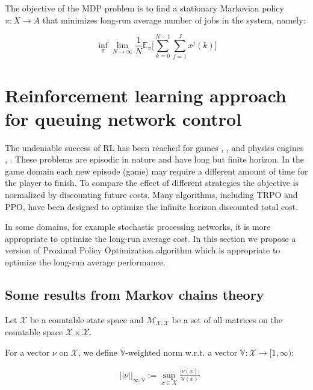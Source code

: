 \documentclass[11pt]{article}
\newcommand{\E}{\mathbb{E}}
\newcommand{\X}{\mathcal{X}}
\newcommand{\M}{\mathcal{M}}
\newcommand{\V}{\mathbb{V}}
\theoremstyle{definition}
\numberwithin{equation}{section}
\begin{document}
The objective of the MDP problem  is to find a stationary Markovian policy $\pi:X\rightarrow A$ that minimizes long-run average number of jobs in the system, namely:

\begin{equation}
 \inf\limits_\pi \lim\limits_{N\rightarrow \infty} \frac{1}{N} \E_{\pi}\Big[\sum\limits_{k=0}^{N-1}\sum\limits_{j=1}^J x^j(k)\Big]
\end{equation}





\section{Reinforcement learning approach for queuing network control}

The undeniable success of RL has been reached for games \cite{Mnih2015}, \cite{Bellemare2013}, and physics engines \cite{Duan2016},  \cite{Todorov2012}. These problems are episodic in nature and have long but finite horizon. In the game domain each new episode (game) may require a different amount of time for the player to finish. To compare the effect of different strategies  the objective is
normalized by discounting future costs.
  Many algorithms, including TRPO and PPO, have been designed to optimize the infinite horizon discounted total cost.

In some domains, for example stochastic processing networks, it is more appropriate to optimize the long-run average cost. In this section we propose a version of  Proximal Policy Optimization algorithm which is appropriate to optimize  the long-run average performance.

\subsection{Some results from Markov chains theory}\label{sec:MC}

Let $\X$ be a countable state space and $\M_{\X, \X}$ be a set of all matrices on the countable space $\X\times \X$.



For a vector $\nu$ on $\X$, we define $\V$-weighted norm w.r.t. a vector $\V:\X\rightarrow [1, \infty)$: 

\begin{align*}
& ||\nu||_{\infty, \V} := \sup\limits_{x\in X} \frac{| \nu(x)|}{\V(x)}\\
\end{align*}
\end{document}
